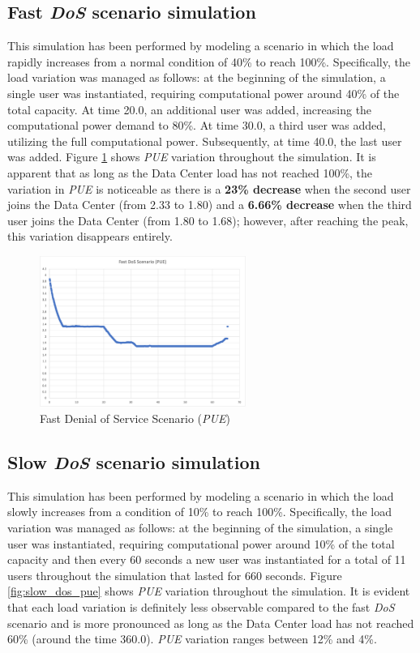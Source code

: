 \subsection{Fast \emph{DoS} scenario simulation}
This simulation has been performed by modeling a scenario in which the load rapidly increases from a normal condition of 40\% to reach 100\%. Specifically, the load variation was managed as follows: at the beginning of the simulation, a single user was instantiated, requiring computational power around 40\% of the total capacity. At time 20.0, an additional user was added, increasing the computational power demand to 80\%. At time 30.0, a third user was added, utilizing the full computational power. Subsequently, at time 40.0, the last user was added. Figure \ref{fig:fast_dos_pue} shows \emph{PUE} variation throughout the simulation. It is apparent that as long as the Data Center load has not reached 100\%, the variation in \emph{PUE} is noticeable as there is a \textbf{23\% decrease} when the second user joins the Data Center (from 2.33 to 1.80) and a \textbf{6.66\% decrease} when the third user joins the Data Center (from 1.80 to 1.68); however, after reaching the peak, this variation disappears entirely. 
\begin{figure}[h]
    \centering
    \includegraphics[width=0.6\textwidth]{chapters/images/fast_dos_pue.png}
    \caption{Fast Denial of Service Scenario (\emph{PUE})}
    \label{fig:fast_dos_pue}
\end{figure}

\subsection{Slow \emph{DoS} scenario simulation}
This simulation has been performed by modeling a scenario in which the load slowly increases from a condition of 10\% to reach 100\%. Specifically, the load variation was managed as follows: at the beginning of the simulation, a single user was instantiated, requiring computational power around 10\% of the total capacity and then every 60 seconds a new user was instantiated for a total of 11 users throughout the simulation that lasted for 660 seconds. Figure \ref{fig:slow_dos_pue} shows \emph{PUE} variation throughout the simulation. It is evident that each load variation is definitely less observable compared to the fast \emph{DoS} scenario and is more pronounced as long as the Data Center load has not reached 60\% (around the time 360.0). \emph{PUE} variation ranges between 12\% and 4\%. 

